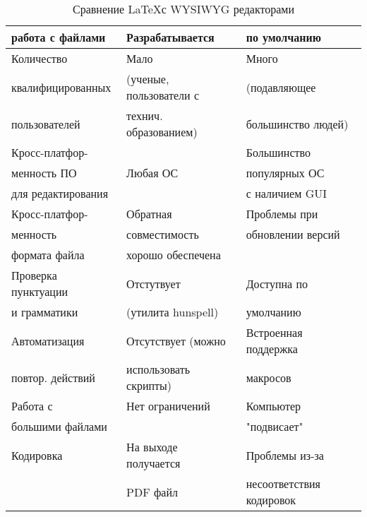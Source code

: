 \begin{table}
\begin{tabular}{|l|l|l|}
работа с файлами&Разрабатывается&  по умолчанию\\
\hline
Количество & Мало&Много \\
квалифицированных&(ученые, пользователи с& (подавляющее \\
пользователей&технич. образованием)& большинство людей) \\
\hline
Кросс-платфор-& & Большинство \\
менность ПО&Любая ОС & популярных ОС  \\
 для редактирования & &  с наличием GUI \\
\hline
Кросс-платфор-&Обратная &Проблемы при \\
менность&совместимость & обновлении версий \\
формата файла &хорошо обеспечена & \\
\hline
Проверка пунктуации&Отстутвует&Доступна по\\
и грамматики&(утилита hunspell)&умолчанию \\
\hline
Автоматизация&Отсутствует (можно& Встроенная поддержка  \\
повтор. действий &использовать скрипты) & макросов \\
\hline
Работа с & Нет ограничений&Компьютер  \\
большими файлами& & "подвисает" \\
\hline
Кодировка& На выходе получается& Проблемы из-за \\
 &PDF файл& несоответствия кодировок \\
\hline
\end{tabular}
\caption{Сравнение \LaTeX с WYSIWYG редакторами}
\end{table}
